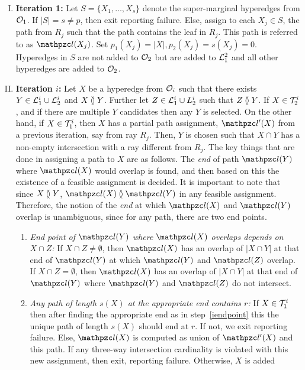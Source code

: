 \noindent
\begin{enumerate}[I.]
\item {\bf Iteration 1:} Let $S=\{X_1,\ldots,X_s\}$ denote the
  super-marginal hyperedges from ${\cal O}_1$.  If $|S|=s \neq p$, then
  exit reporting failure.  Else, assign to each $X_j \in S$, the path
  from $R_j$ such that the path contains the leaf in $R_j$.  This path
  is referred to as $\cl(X_j)$.  Set $p_1(X_j)=|X|, p_2(X_j)=s(X_j)=0$.
  Hyperedges in $S$ are not added to ${\cal O}_2$ but are added to
  ${\cal L}_1^2$ and all other hyperedges are added to
  ${\cal O}_2$.
\item {\bf Iteration $i$:} Let $X$ be a hyperedge from ${\cal O}_i$ such
  that there exists $Y \in {\cal L}_1^i \cup {\cal L}_2^i$ and $X \between
  Y$. Further let $Z \in {\cal L}_1^i \cup L_2^i$ such that $Z \between Y$.
  If $X \in {\cal T}_2^i$, and if there are multiple $Y$ candidates then
  any $Y$ is selected.  On the other hand, if $X \in {\cal T}_1^i$, then
  $X$ has a partial path assignment, $\cl'(X)$ from a previous
  iteration, say from ray $R_j$. Then, $Y$ is
  chosen such that $X \cap Y$ has a non-empty intersection with a ray
  different from $R_j$.  The key things that are done in assigning a
  path to $X$ are as follows. The {\em end} of path $\cl(Y)$ where
  $\cl(X)$ would overlap is found, and then based on this the
  existence of a feasible assignment is decided.  It is important to
  note that since $X \between Y$, $\cl(X) \overlap \cl(Y)$ in any
  feasible assignment.  Therefore, the notion of the {\em end} at
  which $\cl(X)$ and $\cl(Y)$ overlap is unambiguous, since for any
  path, there are two end points.
  \begin{enumerate}
  \item \label{iendpoint} {\em End point of $\cl(Y)$ where $\cl(X)$ overlaps
      depends on $X \cap Z$:} If $X \cap Z
    \neq \emptyset$, then $\cl(X)$ has an overlap of $|X \cap Y|$ at that
    end of $\cl(Y)$ at which $\cl(Y)$ and $\cl(Z)$ overlap.  If $X
    \cap Z = \emptyset$, then $\cl(X)$ has an overlap of $|X \cap Y|$ at
    that end of $\cl(Y)$ where $\cl(Y)$ and $\cl(Z)$ do not intersect.
  \item {\em Any path of length $s(X)$ at the appropriate end contains
      $r$:} If $X \in {\cal T}_1^i$ then after finding the appropriate end
    as in step~\ref{iendpoint} this the unique path of length $s(X)$
    should end at $r$.  If not, we exit reporting failure.  Else,
    $\cl(X)$ is computed as union of $\cl'(X)$ and this path. If any
    three-way intersection cardinality is violated with this new
    assignment, then exit, reporting failure.  Otherwise, $X$ is added

\end{enumerate}
\end{enumerate}
